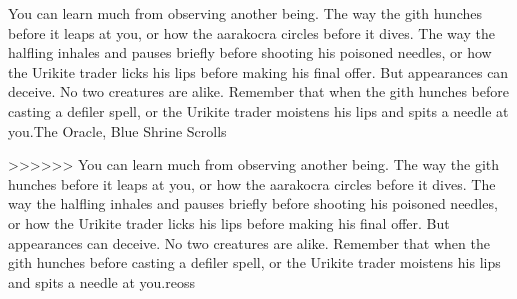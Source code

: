 \documentclass[twocolumn]{d20}
\begin{document}
{You can learn much from observing another being. The way the gith hunches before it leaps at you, or how the aarakocra circles before it dives. The way the halfling inhales and pauses briefly before shooting his poisoned needles, or how the Urikite trader licks his lips before making his final offer. But appearances can deceive. No two creatures are alike. Remember that when the gith hunches before casting a defiler spell, or the Urikite trader moistens his lips and spits a needle at you.}{The Oracle, Blue Shrine Scrolls}


{>>>>>> You can learn much from observing another being. The way the gith hunches before it leaps at you, or how the aarakocra circles before it dives. The way the halfling inhales and pauses briefly before shooting his poisoned needles, or how the Urikite trader licks his lips before making his final offer. But appearances can deceive. No two creatures are alike. Remember that when the gith hunches before casting a defiler spell, or the Urikite trader moistens his lips and spits a needle at you.}{reoss}



\listoftables

\end{document}
